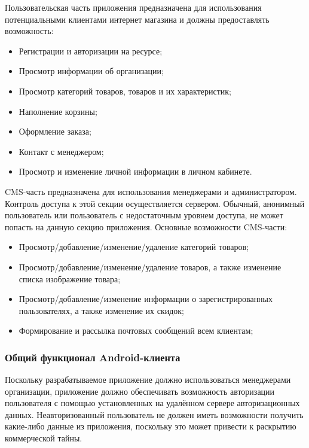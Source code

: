 Пользовательская часть приложения предназначена для использования потенциальными клиентами интернет магазина и должны предоставлять возможность:

\begin{itemize}
    \item Регистрации и авторизации на ресурсе;
    \item Просмотр информации об организации;
    \item Просмотр категорий товаров, товаров и их характеристик;
    \item Наполнение корзины;
    \item Оформление заказа;
    \item Контакт с менеджером;
    \item Просмотр и изменение личной информации в личном кабинете.
\end{itemize}

CMS-часть предназначена для использования менеджерами и администратором.
Контроль доступа к этой секции осуществляется сервером.
Обычный, анонимный пользователь или пользователь с недостаточным уровнем доступа, не может попасть на данную секцию приложения.
Основные возможности CMS-части:

\begin{itemize}
    \item Просмотр/добавление/изменение/удаление категорий товаров;
    \item Просмотр/добавление/изменение/удаление товаров, а также изменение списка изображение товара;
    \item Просмотр/добавление/изменение информации о зарегистрированных пользователях, а также изменение их скидок;
    \item Формирование и рассылка почтовых сообщений всем клиентам;
\end{itemize}

\subsubsection{Общий функционал Android-клиента}\indent

Поскольку разрабатываемое приложение должно использоваться менеджерами организации, приложение должно обеспечивать возможность авторизации пользователя с помощью установленных на удалённом сервере авторизационных данных. Неавторизованный пользователь не должен иметь возможности получить какие-либо данные из приложения, поскольку это может привести к раскрытию коммерческой тайны.

